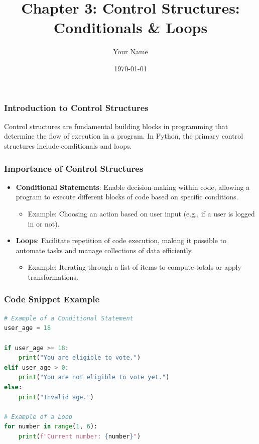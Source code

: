 \documentclass{beamer}
\title{Chapter 3: Control Structures: Conditionals \& Loops}
\author{Your Name}
\institute{Your Institution}
\date{\today}
\begin{document}
\frame{\titlepage}

\begin{frame}[fragile]
    \frametitle{Introduction to Control Structures}

    Control structures are fundamental building blocks in programming that determine the flow of execution in a program. In Python, the primary control structures include conditionals and loops. 
\end{frame}

\begin{frame}[fragile]
    \frametitle{Importance of Control Structures}

    \begin{itemize}
        \item \textbf{Conditional Statements}: Enable decision-making within code, allowing a program to execute different blocks of code based on specific conditions.
            \begin{itemize}
                \item Example: Choosing an action based on user input (e.g., if a user is logged in or not).
            \end{itemize}
        
        \item \textbf{Loops}: Facilitate repetition of code execution, making it possible to automate tasks and manage collections of data efficiently.
            \begin{itemize}
                \item Example: Iterating through a list of items to compute totals or apply transformations.
            \end{itemize}
    \end{itemize}
\end{frame}

\begin{frame}[fragile]
    \frametitle{Code Snippet Example}

    \begin{lstlisting}[language=Python]
# Example of a Conditional Statement
user_age = 18

if user_age >= 18:
    print("You are eligible to vote.")
elif user_age > 0:
    print("You are not eligible to vote yet.")
else:
    print("Invalid age.")

# Example of a Loop
for number in range(1, 6):
    print(f"Current number: {number}")
    \end{lstlisting}
\end{frame}
\end{document}
